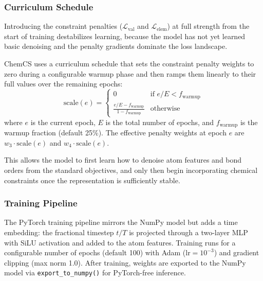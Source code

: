 \documentclass[11pt]{article}
\begin{document}
\subsubsection{Curriculum Schedule}

Introducing the constraint penalties ($\mathcal{L}_{\text{val}}$ and
$\mathcal{L}_{\text{elem}}$) at full strength from the start of training
destabilizes learning, because the model has not yet learned basic
denoising and the penalty gradients dominate the loss landscape.

ChemCS uses a curriculum schedule that sets the constraint penalty
weights to zero during a configurable warmup phase and then ramps them
linearly to their full values over the remaining epochs:
\begin{equation}
\text{scale}(e) = \begin{cases}
  0 & \text{if } e / E < f_{\text{warmup}} \\[2pt]
  \displaystyle\frac{e/E - f_{\text{warmup}}}{1 - f_{\text{warmup}}}
    & \text{otherwise}
\end{cases}
\label{eq:curriculum}
\end{equation}
where $e$ is the current epoch, $E$ is the total number of epochs, and
$f_{\text{warmup}}$ is the warmup fraction (default 25\%). The effective
penalty weights at epoch $e$ are $w_3 \cdot \text{scale}(e)$ and
$w_4 \cdot \text{scale}(e)$.

This allows the model to first learn how to denoise atom features and
bond orders from the standard objectives, and only then begin
incorporating chemical constraints once the representation is
sufficiently stable.

\subsubsection{Training Pipeline}

The PyTorch training pipeline mirrors the NumPy model but adds a
time embedding: the fractional timestep $t/T$ is projected through a
two-layer MLP with SiLU activation and added to the atom features.
Training runs for a configurable number of epochs (default 100) with
Adam ($\text{lr} = 10^{-3}$) and gradient clipping (max norm 1.0).
After training, weights are exported to the NumPy model via
\texttt{export\_to\_numpy()} for PyTorch-free inference.

\end{document}
